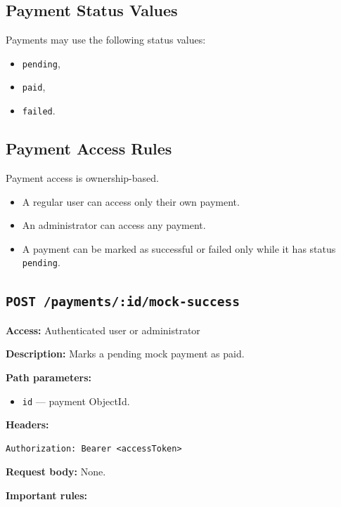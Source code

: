 \subsection{Payment Status Values}

Payments may use the following status values:

\begin{itemize}
    \item \texttt{pending},
    \item \texttt{paid},
    \item \texttt{failed}.
\end{itemize}

\subsection{Payment Access Rules}

Payment access is ownership-based.

\begin{itemize}
    \item A regular user can access only their own payment.
    \item An administrator can access any payment.
    \item A payment can be marked as successful or failed only while it has status \texttt{pending}.
\end{itemize}

\subsection{\texttt{POST /payments/:id/mock-success}}

\textbf{Access:} Authenticated user or administrator

\textbf{Description:} Marks a pending mock payment as paid.

\textbf{Path parameters:}

\begin{itemize}
    \item \texttt{id} --- payment ObjectId.
\end{itemize}

\textbf{Headers:}

\begin{verbatim}
Authorization: Bearer <accessToken>
\end{verbatim}

\textbf{Request body:} None.

\textbf{Important rules:}

